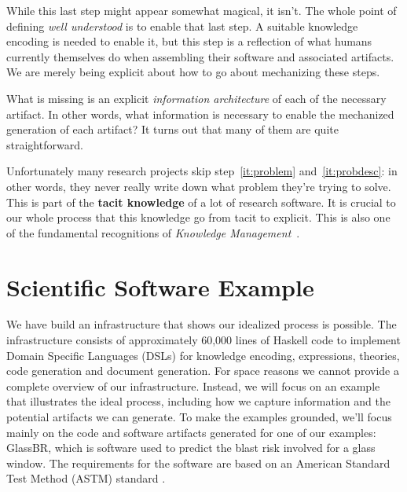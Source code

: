 \documentclass[sigconf,review]{acmart}
\begin{document}
While this last step might appear somewhat magical, it isn't. The whole point of
defining \emph{well understood} is to enable that last step. A suitable
knowledge encoding is needed to enable it, but this step is a reflection of what
humans currently themselves do when assembling their software and associated
artifacts. We are merely being explicit about how to go about mechanizing these
steps.

What is missing is an explicit \emph{information architecture} of each of
the necessary artifact. In other words, what information is necessary to
enable the mechanized generation of each artifact? It turns out that many
of them are quite straightforward.

Unfortunately many research projects skip step~\ref{it:problem}
and~\ref{it:probdesc}: in other words, they never really write down what problem
they're trying to solve. This is part of the \textbf{tacit knowledge} of a lot
of research software.  It is crucial to our whole process that this knowledge go
from tacit to explicit. This is also one of the fundamental recognitions of
\emph{Knowledge Management}~\cite{KM-textbook}.


\section{Scientific Software Example}\label{ch:example}

We have build an infrastructure that shows our idealized process is possible.
The infrastructure consists of approximately 60,000 lines of Haskell code to
implement Domain Specific Languages (DSLs) for knowledge encoding, expressions,
theories, code generation and document generation.  For space reasons we cannot
provide a complete overview of our infrastructure.
Instead, we will focus on an example that illustrates the ideal process,
including how we capture information and the potential artifacts we can
generate.  To make the examples grounded, we'll focus mainly on the code and
software artifacts generated for one of our examples: GlassBR, which is software
used to predict the blast risk involved for a glass window.  The requirements
for the software are based on an American Standard Test Method (ASTM) standard
\cite{BeasonEtAl1998}.
\end{document}
